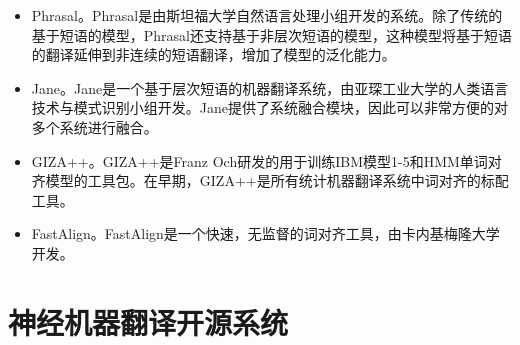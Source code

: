 \begin{appendices}
\begin{itemize}
\vspace{0.5em}
\item Phrasal。Phrasal是由斯坦福大学自然语言处理小组开发的系统。除了传统的基于短语的模型，Phrasal还支持基于非层次短语的模型，这种模型将基于短语的翻译延伸到非连续的短语翻译，增加了模型的泛化能力。
\vspace{0.5em}
\item Jane。Jane是一个基于层次短语的机器翻译系统，由亚琛工业大学的人类语言技术与模式识别小组开发。Jane提供了系统融合模块，因此可以非常方便的对多个系统进行融合。
\vspace{0.5em}
\item GIZA++。GIZA++是Franz Och研发的用于训练IBM模型1-5和HMM单词对齐模型的工具包。在早期，GIZA++是所有统计机器翻译系统中词对齐的标配工具。
\vspace{0.5em}
\item FastAlign。FastAlign是一个快速，无监督的词对齐工具，由卡内基梅隆大学开发。
\vspace{0.5em}
\end{itemize}

\section{神经机器翻译开源系统}


\end{appendices}
